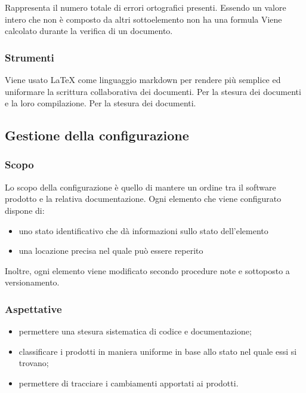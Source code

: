         Rappresenta il numero totale di errori ortografici presenti. Essendo un valore intero che non è composto da altri sottoelemento non ha una formula
        Viene calcolato durante la verifica di un documento.
	    
	    
	    \subsubsection{Strumenti}
	    Viene usato LaTeX come linguaggio markdown per rendere più semplice ed uniformare la scrittura collaborativa dei documenti.
	    Per la stesura dei documenti e la loro compilazione.
	    Per la stesura dei documenti.

	\subsection{Gestione della configurazione}
		
		\subsubsection{Scopo}
		Lo scopo della configurazione è quello di mantere un ordine tra il software prodotto e la relativa documentazione. Ogni elemento che viene configurato dispone di:
			\begin{itemize}
				\item uno stato identificativo che dà informazioni sullo stato dell'elemento
				\item una locazione precisa nel quale può essere reperito
			\end{itemize}
		Inoltre, ogni elemento viene modificato secondo procedure note e sottoposto a versionamento.
		
		\subsubsection{Aspettative}
		\begin{itemize}
			\item permettere una stesura sistematica di codice e documentazione;
			\item classificare i prodotti in maniera uniforme in base allo stato nel quale essi si trovano;
			\item permettere di tracciare i cambiamenti apportati ai prodotti.
		\end{itemize}
		
